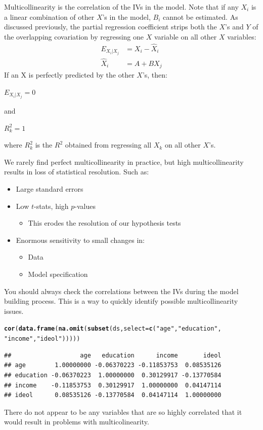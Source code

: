 \documentclass[11pt,openany]{book}\usepackage[]{graphicx}\usepackage[]{color}
\makeatletter
\newcommand{\hlstr}[1]{\textcolor[rgb]{0.192,0.494,0.8}{#1}}%
\newcommand{\hlstd}[1]{\textcolor[rgb]{0.345,0.345,0.345}{#1}}%
\newcommand{\hlkwc}[1]{\textcolor[rgb]{0.333,0.667,0.333}{#1}}%
\newcommand{\hlkwd}[1]{\textcolor[rgb]{0.737,0.353,0.396}{\textbf{#1}}}%
\newenvironment{kframe}{%
 \def\at@end@of@kframe{}%
 \ifinner\ifhmode%
  \def\at@end@of@kframe{\end{minipage}}%
  \begin{minipage}{\columnwidth}%
 \fi\fi%
 \def\FrameCommand##1{\hskip\@totalleftmargin \hskip-\fboxsep
 \colorbox{shadecolor}{##1}\hskip-\fboxsep
     \hskip-\linewidth \hskip-\@totalleftmargin \hskip\columnwidth}%
 \MakeFramed {\advance\hsize-\width
   \@totalleftmargin\z@ \linewidth\hsize
   \@setminipage}}%
 {\par\unskip\endMakeFramed%
 \at@end@of@kframe}
\newenvironment{knitrout}{}{} %
\renewenvironment{knitrout}{\begin{singlespace}}{\end{singlespace}} %
\makeatother
\begin{document}
Multicollinearity is the correlation of the IVs in the model. Note that if any $X_i$ is a linear combination of other $X$'s in the model, $B_i$ cannot be estimated. As discussed previously, the partial regression coefficient strips both the $X$'s and $Y$ of the overlapping covariation by regressing one $X$ variable on all other $X$ variables: 
\begin{align*}
  E_{X_{i}|X_{j}} &= X_i - \hat{X}_i \\
  \hat{X}_i &= A + BX_j 
\end{align*}
If an X is perfectly predicted by the other $X$'s, then:
\begin{center}
  $E_{X_{i}|X_{j}}=0$ 
  
  and 
  
  $R^2_k=1$
\end{center}
\noindent where $R^2_k$ is the $R^2$ obtained from regressing all
$X_k$ on all other $X$'s. 

We rarely find perfect multicollinearity in practice, but high multicollinearity results in loss of statistical resolution. Such as:  
\begin{itemize}
\item Large standard errors
\item Low $t$-stats, high $p$-values
  \begin{itemize}
\item This erodes the resolution of our hypothesis tests
  \end{itemize}
\item Enormous sensitivity to small changes in:
  \begin{itemize}
\item Data
\item Model specification
  \end{itemize}
  \end{itemize}

You should always check the correlations between the IVs during the model building process. This is a way to quickly identify possible multicollinearity issues.
\begin{knitrout}
\color{fgcolor}\begin{kframe}
\begin{alltt}
\hlkwd{cor}\hlstd{(}\hlkwd{data.frame}\hlstd{(}\hlkwd{na.omit}\hlstd{(}\hlkwd{subset}\hlstd{(ds,} \hlkwc{select} \hlstd{=} \hlkwd{c}\hlstd{(}\hlstr{"age"}\hlstd{,} \hlstr{"education"}\hlstd{,}
    \hlstr{"income"}\hlstd{,} \hlstr{"ideol"}\hlstd{)))))}
\end{alltt}
\begin{verbatim}
##                   age   education      income       ideol
## age        1.00000000 -0.06370223 -0.11853753  0.08535126
## education -0.06370223  1.00000000  0.30129917 -0.13770584
## income    -0.11853753  0.30129917  1.00000000  0.04147114
## ideol      0.08535126 -0.13770584  0.04147114  1.00000000
\end{verbatim}
\end{kframe}
\end{knitrout}
\noindent There do not appear to be any variables that are so highly correlated that it would result in problems with multicolinearity. 
\end{document}
